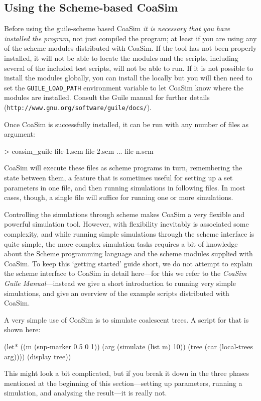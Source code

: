 \documentclass{manual}
\begin{document}
\subsection{Using the Scheme-based CoaSim}
\label{sec:using-scheme-based}

Before using the guile-scheme based CoaSim \emph{it is necessary that
  you have installed the program}, not just compiled the program; at
least if you are using any of the scheme modules distributed with
CoaSim.  If the tool has not been properly installed, it will not be
able to locate the modules and the scripts, including several of the
included test scripts, will not be able to run.  If it is not possible
to install the modules globally, you can install the locally but you
will then need to set the \verb?GUILE_LOAD_PATH? environment variable
to let CoaSim know where the modules are installed.  Consult the Guile
manual for further details (\verb?http://www.gnu.org/software/guile/docs/?).

Once CoaSim is successfully installed, it can be run with any number
of files as argument:
\begin{code}
> coasim_guile file-1.scm file-2.scm ... file-n.scm
\end{code}
CoaSim will execute these files as scheme programs in turn,
remembering the state between them, a feature that is sometimes useful
for setting up a set parameters in one file, and then running
simulations in following files.  In most cases, though, a single file
will suffice for running one or more simulations.

Controlling the simulations through scheme makes CoaSim a very
flexible and powerful simulation tool. However, with flexibility
inevitably is associated some complexity, and while running simple
simulations through the scheme interface is quite simple, the more
complex simulation tasks requires a bit of knowledge about the Scheme
programming language and the scheme modules supplied with CoaSim.  To
keep this `getting started' guide short, we do not attempt to explain
the scheme interface to CoaSim in detail here---for this we refer to
the \emph{CoaSim Guile Manual}---instead we give a short introduction
to running very simple simulations, and give an overview of the
example scripts distributed with CoaSim.

A very simple use of CoaSim is to simulate coalescent trees.  A script
for that is shown here:
\begin{code}
(let* ((m (snp-marker 0.5 0 1))
       (arg (simulate (list m) 10))
       (tree (car (local-trees arg))))
  (display tree))
\end{code}
This might look a bit complicated, but if you break it down in the
three phases mentioned at the beginning of this section---setting up
parameters, running a simulation, and analysing the result---it is
really not.
\end{document}
